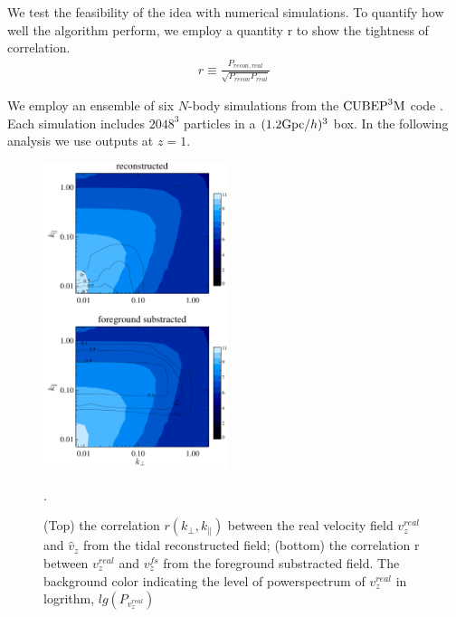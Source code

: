 We test the feasibility of the idea with numerical 
simulations. 
To quantify how well the algorithm perform, we employ a quantity r to show the tightness of correlation.
\begin{eqnarray}
	r\equiv \frac{P_{recon,real}}{\sqrt{P_{recon}P_{real}}}\,
\end{eqnarray}

We employ an ensemble of six $N$-body simulations from the
$\mathrm{CUBEP}^3\mathrm{M}$ code \cite{2013:code}. 
Each simulation includes $2048^3$ particles in a $(1.2\mathrm{Gpc}/h)^3$ box. 
In the following analysis we use outputs at $z=1$.

\begin{figure}[tbp]
	\begin{center}
		\includegraphics[width=0.48\textwidth]{vmode.pdf}
	\end{center}
	\vspace{-0.7cm}
	\caption{(Top) the correlation $r(k_\perp,k_\parallel)$ between the real velocity field $v_z^{real}$ and $\hat v_z$ from the tidal reconstructed field; 
(bottom) the correlation r between $v_z^{real}$ and $v_z^{fs}$ from the foreground substracted field. 
The background color indicating the level of powerspectrum of $v_z^{real}$ in logrithm, $lg(P_{v_z^{real}})$}. 
\label{fig:vmode}
\end{figure}

